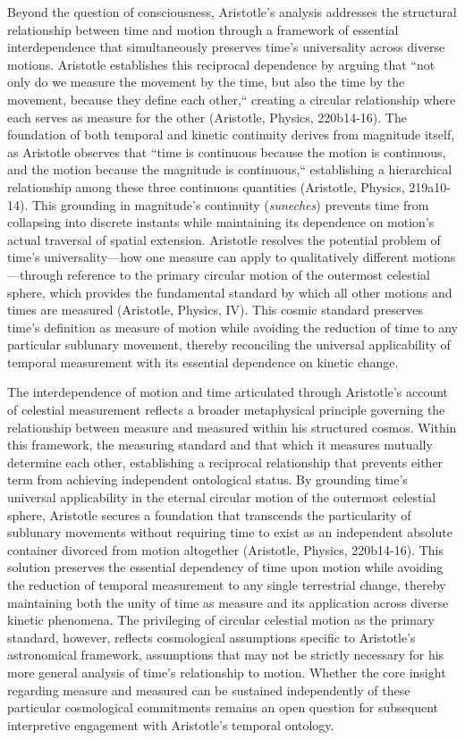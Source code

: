 \documentclass[12pt,a4paper]{article}
\begin{document}
Beyond the question of consciousness, Aristotle's analysis addresses the structural relationship between time and motion through a framework of essential interdependence that simultaneously preserves time's universality across diverse motions. Aristotle establishes this reciprocal dependence by arguing that ``not only do we measure the movement by the time, but also the time by the movement, because they define each other,`` creating a circular relationship where each serves as measure for the other (Aristotle, Physics, 220b14-16). The foundation of both temporal and kinetic continuity derives from magnitude itself, as Aristotle observes that ``time is continuous because the motion is continuous, and the motion because the magnitude is continuous,`` establishing a hierarchical relationship among these three continuous quantities (Aristotle, Physics, 219a10-14). This grounding in magnitude's continuity (\textit{suneches}) prevents time from collapsing into discrete instants while maintaining its dependence on motion's actual traversal of spatial extension. Aristotle resolves the potential problem of time's universality—how one measure can apply to qualitatively different motions—through reference to the primary circular motion of the outermost celestial sphere, which provides the fundamental standard by which all other motions and times are measured (Aristotle, Physics, IV). This cosmic standard preserves time's definition as measure of motion while avoiding the reduction of time to any particular sublunary movement, thereby reconciling the universal applicability of temporal measurement with its essential dependence on kinetic change.

The interdependence of motion and time articulated through Aristotle's account of celestial measurement reflects a broader metaphysical principle governing the relationship between measure and measured within his structured cosmos. Within this framework, the measuring standard and that which it measures mutually determine each other, establishing a reciprocal relationship that prevents either term from achieving independent ontological status. By grounding time's universal applicability in the eternal circular motion of the outermost celestial sphere, Aristotle secures a foundation that transcends the particularity of sublunary movements without requiring time to exist as an independent absolute container divorced from motion altogether (Aristotle, Physics, 220b14-16). This solution preserves the essential dependency of time upon motion while avoiding the reduction of temporal measurement to any single terrestrial change, thereby maintaining both the unity of time as measure and its application across diverse kinetic phenomena. The privileging of circular celestial motion as the primary standard, however, reflects cosmological assumptions specific to Aristotle's astronomical framework, assumptions that may not be strictly necessary for his more general analysis of time's relationship to motion. Whether the core insight regarding measure and measured can be sustained independently of these particular cosmological commitments remains an open question for subsequent interpretive engagement with Aristotle's temporal ontology.
\end{document}
